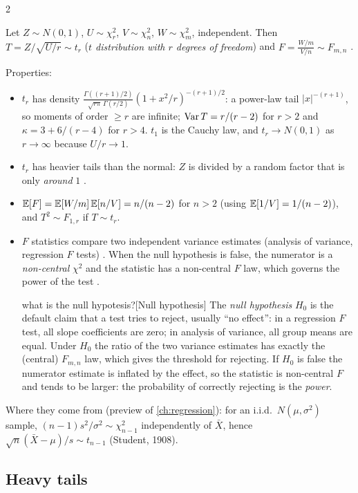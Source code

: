 \begin{paracol}{2}
\begin{definition}
Let $Z\sim N(0,1)$, $U\sim\chi^2_r$, $V\sim\chi^2_n$, $W\sim\chi^2_m$, independent. Then
$T=Z/\sqrt{U/r}\sim t_r$ (\emph{$t$ distribution with $r$ degrees of freedom})  and
$F=\frac{W/m}{V/n}\sim F_{m,n}$ .
\end{definition}
Properties:
\begin{itemize}
  \item $t_r$ has density $\frac{\Gamma((r+1)/2)}{\sqrt{r\pi}\,\Gamma(r/2)}(1+x^2/r)^{-(r+1)/2}$: a power-law tail $|x|^{-(r+1)}$, so moments of
        order $\ge r$ are infinite; $\operatorname{Var} T=r/(r-2)$ for $r>2$ and $\kappa=3+6/(r-4)$ for $r>4$. $t_1$ is the Cauchy law,
        and $t_r\to N(0,1)$ as $r\to\infty$ because $U/r\to1$.
  \item $t_r$ has heavier tails than the normal: $Z$ is divided by a random factor that is only \emph{around} $1$
        .
  \item $\mathbb{E}[F]=\mathbb{E}[W/m]\,\mathbb{E}[n/V]=n/(n-2)$ for $n>2$ (using $\mathbb{E}[1/V]=1/(n-2)$), and $T^2\sim F_{1,r}$ if $T\sim t_r$.
  \item $F$ statistics compare two independent variance estimates (analysis of variance, regression $F$ tests)
        . When the null hypothesis is false, the numerator is a \emph{non-central} $\chi^2$ and the
        statistic has a non-central $F$ law, which governs the power of the test .\begin{answer}{what is the null hypotesis?}[Null hypothesis]
The \emph{null hypothesis} $H_0$ is the default claim that a test tries to reject, usually ``no effect'': in a regression $F$ test, all slope coefficients are
zero; in analysis of variance, all group means are equal. Under $H_0$ the ratio of the two variance estimates has exactly the
(central) $F_{m,n}$ law, which gives the threshold for rejecting. If $H_0$ is false the numerator estimate is inflated by the effect, so the
statistic is non-central $F$ and tends to be larger: the probability of correctly rejecting is the \emph{power}.
\end{answer}
\end{itemize}
Where they come from (preview of \cref{ch:regression}): for an i.i.d.\ $N(\mu,\sigma^2)$ sample, $(n-1)s^2/\sigma^2\sim\chi^2_{n-1}$
independently of $\bar X$, hence $\sqrt n(\bar X-\mu)/s\sim t_{n-1}$ (Student, 1908).

\subsection{Heavy tails}\label{ch03:sec-heavy}


\end{paracol}
